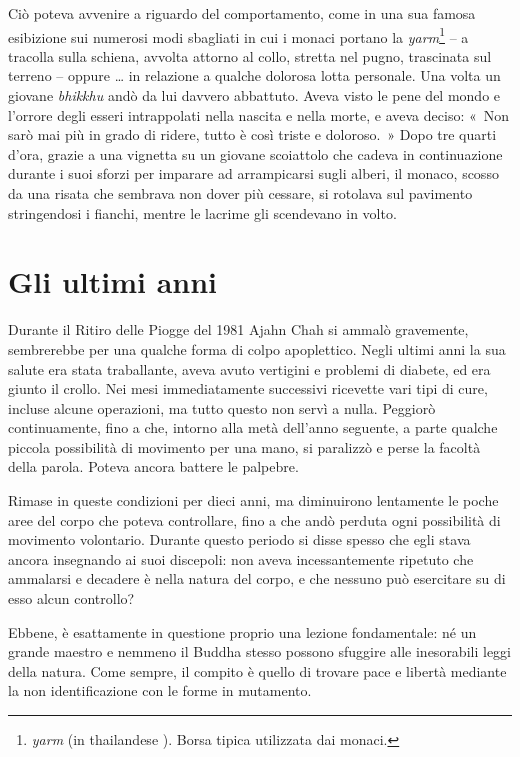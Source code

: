 Ciò poteva avvenire a riguardo del comportamento, come in una sua famosa
esibizione sui numerosi modi sbagliati in cui i monaci portano la
\emph{yarm}\footnote{\emph{yarm} (in thailandese ). Borsa tipica
  utilizzata dai monaci.} -- a tracolla sulla schiena, avvolta attorno
al collo, stretta nel pugno, trascinata sul terreno -- oppure \ldots{} in
relazione a qualche dolorosa lotta personale. Una volta un giovane
\emph{bhikkhu} andò da lui davvero abbattuto. Aveva visto le pene del
mondo e l'orrore degli esseri intrappolati nella nascita e nella morte,
e aveva deciso: «~Non sarò mai più in grado di ridere, tutto è così
triste e doloroso.~» Dopo tre quarti d'ora, grazie a una vignetta su un
giovane scoiattolo che cadeva in continuazione durante i suoi sforzi per
imparare ad arrampicarsi sugli alberi, il monaco, scosso da una risata
che sembrava non dover più cessare, si rotolava sul pavimento
stringendosi i fianchi, mentre le lacrime gli scendevano in volto.

\section{Gli ultimi anni}

Durante il Ritiro delle Piogge del 1981 Ajahn Chah si ammalò gravemente,
sembrerebbe per una qualche forma di colpo apoplettico. Negli ultimi
anni la sua salute era stata traballante, aveva avuto vertigini e
problemi di diabete, ed era giunto il crollo. Nei mesi immediatamente
successivi ricevette vari tipi di cure, incluse alcune operazioni, ma
tutto questo non servì a nulla. Peggiorò continuamente, fino a che,
intorno alla metà dell'anno seguente, a parte qualche piccola
possibilità di movimento per una mano, si paralizzò e perse la facoltà
della parola. Poteva ancora battere le palpebre.

Rimase in queste condizioni per dieci anni, ma diminuirono lentamente le
poche aree del corpo che poteva controllare, fino a che andò perduta
ogni possibilità di movimento volontario. Durante questo periodo si
disse spesso che egli stava ancora insegnando ai suoi discepoli: non
aveva incessantemente ripetuto che ammalarsi e decadere è nella natura
del corpo, e che nessuno può esercitare su di esso alcun controllo?

Ebbene, è esattamente in questione proprio una lezione fondamentale: né
un grande maestro e nemmeno il Buddha stesso possono sfuggire alle
inesorabili leggi della natura. Come sempre, il compito è quello di
trovare pace e libertà mediante la non identificazione con le forme in
mutamento.

